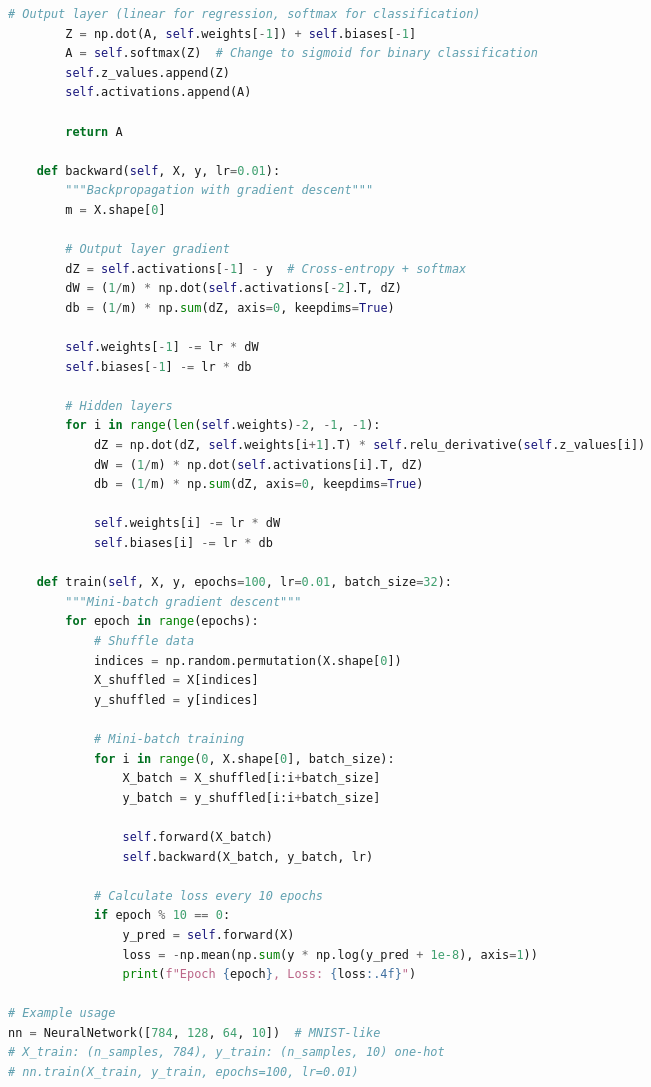\documentclass[8pt,landscape]{article}
\begin{document}
\begin{multicols}{3}
\begin{lstlisting}[language=Python]
        # Output layer (linear for regression, softmax for classification)
        Z = np.dot(A, self.weights[-1]) + self.biases[-1]
        A = self.softmax(Z)  # Change to sigmoid for binary classification
        self.z_values.append(Z)
        self.activations.append(A)

        return A

    def backward(self, X, y, lr=0.01):
        """Backpropagation with gradient descent"""
        m = X.shape[0]

        # Output layer gradient
        dZ = self.activations[-1] - y  # Cross-entropy + softmax
        dW = (1/m) * np.dot(self.activations[-2].T, dZ)
        db = (1/m) * np.sum(dZ, axis=0, keepdims=True)

        self.weights[-1] -= lr * dW
        self.biases[-1] -= lr * db

        # Hidden layers
        for i in range(len(self.weights)-2, -1, -1):
            dZ = np.dot(dZ, self.weights[i+1].T) * self.relu_derivative(self.z_values[i])
            dW = (1/m) * np.dot(self.activations[i].T, dZ)
            db = (1/m) * np.sum(dZ, axis=0, keepdims=True)

            self.weights[i] -= lr * dW
            self.biases[i] -= lr * db

    def train(self, X, y, epochs=100, lr=0.01, batch_size=32):
        """Mini-batch gradient descent"""
        for epoch in range(epochs):
            # Shuffle data
            indices = np.random.permutation(X.shape[0])
            X_shuffled = X[indices]
            y_shuffled = y[indices]

            # Mini-batch training
            for i in range(0, X.shape[0], batch_size):
                X_batch = X_shuffled[i:i+batch_size]
                y_batch = y_shuffled[i:i+batch_size]

                self.forward(X_batch)
                self.backward(X_batch, y_batch, lr)

            # Calculate loss every 10 epochs
            if epoch % 10 == 0:
                y_pred = self.forward(X)
                loss = -np.mean(np.sum(y * np.log(y_pred + 1e-8), axis=1))
                print(f"Epoch {epoch}, Loss: {loss:.4f}")

# Example usage
nn = NeuralNetwork([784, 128, 64, 10])  # MNIST-like
# X_train: (n_samples, 784), y_train: (n_samples, 10) one-hot
# nn.train(X_train, y_train, epochs=100, lr=0.01)
\end{lstlisting}


\end{multicols}
\end{document}
